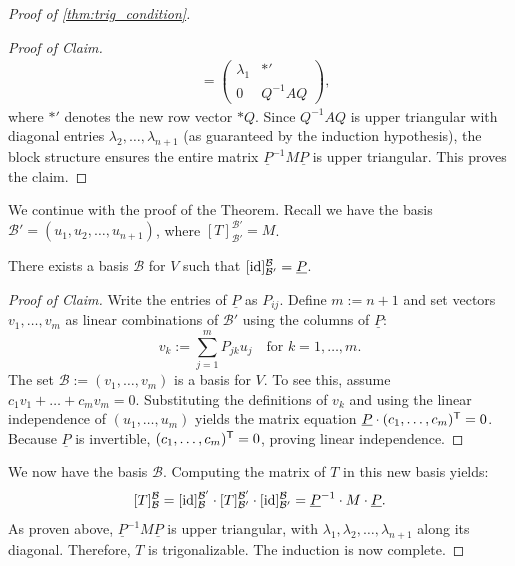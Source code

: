 \begin{proof}[Proof of \cref{thm:trig_condition}]
\begin{proof}[Proof of Claim]
\begin{align*}
      &= \left(\begin{array}{c|c} \lambda_1 & *' \\ \hline 0 & Q^{-1}AQ \end{array}\right),
    \end{align*}
    where $*'$ denotes the new row vector $*Q$.
    Since $Q^{-1}AQ$ is upper triangular with diagonal entries $\lambda_2, \dots, \lambda_{n+1}$ (as guaranteed by the induction hypothesis), the block structure ensures the entire matrix $\underline{P}^{-1}M\underline{P}$ is upper triangular. This proves the claim.
  \end{proof}

  We continue with the proof of the Theorem. Recall we have the basis $\mathcal{B}' = (u_1, u_2, \dots, u_{n+1})$, where $[T]_{\mathcal{B}'}^{\mathcal{B}'} = M$.

  \begin{claim*}\label{claim:trig_basis_exists}
    There exists a basis $\mathcal{B}$ for $V$ such that $[\operatorname{id}]_{\mathcal{B}'}^{\mathcal{B}} = \underline{P}$.
  \end{claim*}

  \begin{proof}[Proof of Claim]
    Write the entries of $\underline{P}$ as $P_{ij}$. Define $m := n+1$ and set vectors $v_1, \dots, v_m$ as linear combinations of $\mathcal{B}'$ using the columns of $\underline{P}$:
    \[ v_k := \sum_{j=1}^m P_{jk} u_j \quad \text{for } k = 1, \dots, m. \]
    The set $\mathcal{B} := (v_1, \dots, v_m)$ is a basis for $V$.
    To see this, assume $c_1 v_1 + \dots + c_m v_m = 0$. Substituting the definitions of $v_k$ and using the linear independence of $(u_1, \dots, u_m)$ yields the matrix equation $\underline{P} \cdot (c_1, \dots, c_m)^{\mathsf{T}} = 0$.
    Because $\underline{P}$ is invertible, $(c_1, \dots, c_m)^{\mathsf{T}} = 0$, proving linear independence.
  \end{proof}

  We now have the basis $\mathcal{B}$. Computing the matrix of $T$ in this new basis yields:
  \begin{equation} \label{eq:final_trigonal_matrix}
    [T]_{\mathcal{B}}^{\mathcal{B}} = [\operatorname{id}]_{\mathcal{B}}^{\mathcal{B}'} \cdot [T]_{\mathcal{B}'}^{\mathcal{B}'} \cdot [\operatorname{id}]_{\mathcal{B}'}^{\mathcal{B}} = \underline{P}^{-1} \cdot M \cdot \underline{P}.
  \end{equation}
  As proven above, $\underline{P}^{-1} M \underline{P}$ is upper triangular, with $\lambda_1, \lambda_2, \dots, \lambda_{n+1}$ along its diagonal. Therefore, $T$ is trigonalizable. The induction is now complete.
\end{proof}

